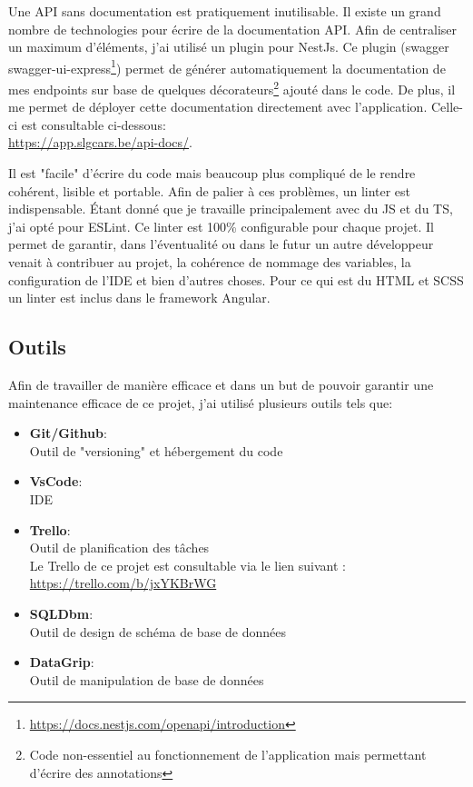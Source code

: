 \newpara

Une API sans documentation est pratiquement inutilisable. Il existe un grand nombre de technologies pour écrire de la documentation API. Afin de centraliser un maximum d'éléments, j'ai utilisé un plugin pour NestJs. Ce plugin (swagger swagger-ui-express\footnote{\url{https://docs.nestjs.com/openapi/introduction}}) permet de générer automatiquement la documentation de mes endpoints sur base de quelques décorateurs\footnote{Code non-essentiel au fonctionnement de l'application mais permettant d'écrire des annotations} ajouté dans le code. De plus, il me permet de déployer cette documentation directement avec l'application. Celle-ci est consultable ci-dessous:\\\url{https://app.slgcars.be/api-docs/}.

\newpage


Il est "facile" d'écrire du code mais beaucoup plus compliqué de le rendre cohérent, lisible et portable. Afin de palier à ces problèmes, un linter est indispensable. Étant donné que je travaille principalement avec du JS et du TS, j'ai opté pour ESLint. Ce linter est 100\% configurable pour chaque projet. Il permet de garantir, dans l'éventualité ou dans le futur un autre développeur venait à contribuer au projet, la cohérence de nommage des variables, la configuration de l'IDE et bien d'autres choses. Pour ce qui est du HTML et SCSS un linter est inclus dans le framework Angular.

\subsection{Outils}

Afin de travailler de manière efficace et dans un but de pouvoir garantir une maintenance efficace de ce projet, j'ai utilisé plusieurs outils tels que:

\newpara

\begin{itemize}
  \item \textbf{Git/Github}: \\ Outil de "versioning" et hébergement du code 
  \item \textbf{VsCode}: \\ IDE 
  \item \textbf{Trello}: \\ Outil de planification des tâches \\ Le Trello de ce projet est consultable via le lien suivant : \url{https://trello.com/b/jxYKBrWG}
  \item \textbf{SQLDbm}: \\ Outil de design de schéma de base de données
  \item \textbf{DataGrip}: \\ Outil de manipulation de base de données
\end{itemize}
